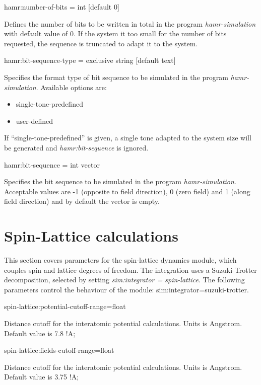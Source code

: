{\zicf hamr:number-of-bits = int [default $0$]}
Defines the number of bits to be written in total in the program \textit{hamr-simulation} with default value of 0.
If the system it too small for the number of bits requested, the sequence is truncated to adapt it to the system.

{\zicf hamr:bit-sequence-type =  exclusive string [default text]}
Specifies the format type of bit sequence to be simulated in the program \textit{hamr-simulation}. Available options are:
\begin{itemize}
	\item[] single-tone-predefined
	\item[] user-defined
\end{itemize}
If ``single-tone-predefined'' is given, a single tone adapted to the system size will be generated and \textit{ hamr:bit-sequence} is ignored.

{\zicf hamr:bit-sequence = int vector}
Specifies the bit sequence to be simulated in the program \textit{hamr-simulation}.
Acceptable values are -1 (opposite to field direction), 0 (zero field) and 1 (along field direction) and by default the vector is empty.

\section*{Spin-Lattice calculations}
This section covers parameters for the spin-lattice dynamics module, which couples spin and lattice degrees of freedom. The integration uses a Suzuki-Trotter decomposition, selected by setting \textit{sim:integrator = spin-lattice}. The following parameters control the behaviour of the module:
sim:integrator=suzuki-trotter.

{\zicf spin-lattice:potential-cutoff-range=float}
Distance cutoff for the interatomic potential calculations. Units is Angstrom.  Default value is 7.8 !A;

{\zicf spin-lattice:fields-cutoff-range=float}
Distance cutoff for the interatomic potential calculations. Units is Angstrom.  Default value is 3.75 !A;

